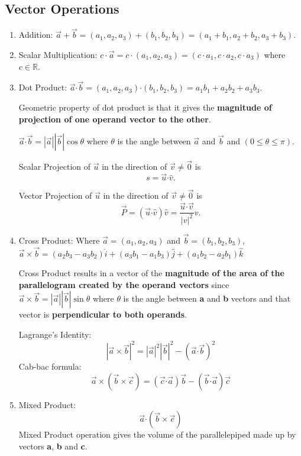 \documentclass[12pt]{article}
\newcommand{\dotp}{{\boldsymbol \cdot}}
\begin{document}
\subsection{Vector Operations}
\begin{enumerate}
\item Addition: $\overrightarrow{a} + \overrightarrow{b} = (a_1,a_2,a_3)+(b_1,b_2,b_3)=(a_1+b_1,a_2+b_2,a_3+b_3) $.
\item Scalar Multiplication: $c\cdot \overrightarrow{a}=c\cdot (a_1,a_2,a_3)=(c\cdot a_1, c\cdot a_2, c\cdot a_3)$ where $c\in \mathbb{R}$.
\item Dot Product: $\vec{a} \dotp \vec b  = (a_1,a_2,a_3)\dotp (b_1,b_2,b_3)= a_1 b_1+a_2 b_2+ a_3 b_3$. 

Geometric property of dot product is that it gives the \textbf{magnitude of projection of one operand vector to the other}. 

$\vec{a} \dotp \vec{b}= |\vec{a}||\vec{b}|\cos \theta$ where $\theta$ is the angle between $\vec a$ and $\vec b$ and $  (0 \leq \theta \leq \pi)$.

Scalar Projection of $\vec u $ in the direction of $\vec v \neq \vec 0$ is $$s= \vec u \dotp \hat v .$$

Vector Projection of $\vec u $ in the direction of $\vec v \neq \vec 0$ is $$\vec P = (\vec u \dotp \hat v) \hat v = \frac{\vec u \dotp \vec v}{|v|^2} v .$$
\item Cross Product: Where $\vec a= (a_1,a_2,a_3)$ and $\vec b=(b_1,b_2,b_3)$,\\ $\vec a \times \vec b = (a_2b_3-a_3b_2)\hat i + (a_3b_1-a_1b_3)\hat j+ (a_1b_2-a_2b_1)\hat k$

Cross Product results in a vector of the \textbf{magnitude of the area of the parallelogram created by the operand vectors} since $\vec a \times \vec b = |\vec a||\vec b|\sin \theta$ where $\theta$ is the angle between \textbf{a} and \textbf{b} vectors and that vector is \textbf{perpendicular to both operands}.

Lagrange's Identity: $$ |\vec a \times \vec b |^2= |\vec a|^2|\vec b|^2 - (\vec a \dotp \vec b)^2$$
Cab-bac formula: $$\vec a \times (\vec b \times \vec c) = (\vec c \dotp \vec a)\vec b - (\vec b \dotp \vec a)\vec c$$
\item Mixed Product: $$\vec a \dotp (\vec b \times \vec c)$$
Mixed Product operation gives the volume of the parallelepiped made up by vectors \textbf{a}, \textbf{b} and \textbf{c}.
\end{enumerate}
\end{document}
